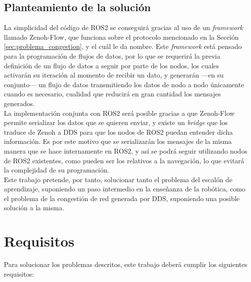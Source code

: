 \subsection{Planteamiento de la solución}
\label{sec:planteamiento_solucion}

La simplicidad del código de ROS2 se conseguirá gracias al uso de un
\textit{framework} llamado Zenoh-Flow, que funciona sobre el protocolo
mencionado en la Sección \ref{sec:problema_congestion}, y el cuál le da
nombre.
Este \textit{framework} está pensado para la programación de flujos de datos,
por lo que se requerirá la previa definición de un flujo de datos a seguir por
parte de los nodos, los cuales activarán su iteración al momento de recibir un
dato, y generarán ---en su conjunto--- un flujo de datos transmitiendo los datos
de nodo a nodo únicamente cuando es necesario, cualidad que reducirá en gran
cantidad los mensajes generados.
\\

La implementación conjunta con ROS2 será posible gracias a que Zenoh-Flow
permite serializar los datos que se quieren enviar, y existe un \textit{bridge}
que los traduce de Zenoh a DDS para que los nodos de ROS2 puedan entender dicha
información.
Es por este motivo que se serializarán los mensajes de la misma manera que se
hace internamente en ROS2, y así se podrá seguir utilizando nodos de ROS2
existentes, como pueden ser los relativos a la navegación, lo que evitará la
complejidad de su programación.
\\

Este trabajo pretende, por tanto, solucionar tanto el problema del escalón de
aprendizaje, suponiendo un paso intermedio en la enseñanza de la robótica, como
el problema de la congestión de red generada por DDS, suponiendo una posible
solución a la misma.


\section{Requisitos}
\label{sec:requisitos}

Para solucionar los problemas descritos, este trabajo deberá cumplir los
siguientes requisitos:

